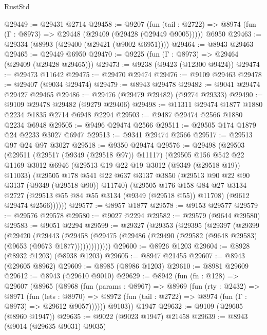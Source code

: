 \begin{lexlean}{RustStd}
\begin{coremodule}
@29449 := @29431 @2714
@29458 := @9207
    (fun (tail : @2722) => @8974 (fun (Γ : @8973) => @29448 (@29409 (@29428 (@29449 @9005)))))
    @6950
@29463 := @29334 (@8993 (@29400 (@29421 (@9002 @6951))))
@29464 := @8943 @29463
@29465 := @29449 @6950
@29470 := @9225 (fun (Γ : @8973) => @29464 (@29409 (@29428 @29465)))
@29473 := @9238 (@9423 (@12300 @9424))
@29474 := @29473 @11642
@29475 := @29470 @29474
@29476 := @9109 @29463
@29478 := @29407 (@9034 @29474)
@29479 := @8943 @29478
@29482 := @9041 @29474 @29427 @29465
@29486 := @29476 (@29479 @29482) (@9274 @29333)
@29490 := @9109 @29478 @29482 (@9279 @29406)
@29498 := @11311 @29474 @1877 @1880 @2234 @1835 @2714 @6948 @2294
@29503 := @9487 @29474 @2566 @1880 @2234 @6948
@29505 := @9496 @29474 @2566
@29511 := @29505 @174 @1879 @24 @2233 @3027 @6947
@29513 := @9341 @29474 @2566
@29517 := @29513 @97 @24 @97 @3027
@29518 := @9350 @29474
@29576 := @29498
    (@29503
      (@29511
        (@29517 (@9349 (@29518 @97)) @11117)
        (@29505
          @156
          @542
          @22
          @1169
          @3012
          @6946
          (@29513 @19 @22 @19 @3012 (@9349 (@29518 @19)) @11033)
          (@29505
            @178
            @541
            @22
            @637
            @3137
            @3850
            (@29513 @90 @22 @90 @3137 (@9349 (@29518 @90)) @11740)
            (@29505
              @176
              @158
              @84
              @27
              @3134
              @2727
              (@29513 @55 @84 @55 @3134 (@9349 (@29518 @55)) @11708)
              (@9612 @29474 @2566))))))
@29577 := @8957 @1877
@29578 := @9153 @29577
@29579 := @29576 @29578
@29580 := @9027 @2294
@29582 := @29579 (@9644 @29580)
@29583 := @9051 @2294
@29599 := @29327
    (@29353
      (@29395
        (@29397
          (@29399
            (@29420
              (@29443
                (@29458
                  (@29475 (@29486 (@29490 (@29582 (@9648 @29583) (@9653 (@9673 @1877)))))))))))))
@29600 := @8926 @1203
@29604 := @8928 (@8932 @1203) (@8938 @1203)
@29605 := @8947 @21455
@29607 := @8943 (@29605 @8962)
@29609 := @8985 (@8986 @1203)
@29610 := @8981 @29609
@29612 := @8943 (@29610 @9010)
@29629 := @8942
    (fun (fn : @128) =>
    @29607
      (@8965
        (@8968
          (fun (params : @8967) =>
          @8969
            (fun (rty : @2432) =>
            @8971
              (fun (lets : @8970) =>
              @8972 (fun (tail : @2722) => @8974 (fun (Γ : @8973) => @29612 @9057))))))
        @9103))
    @1947
@29632 := @9109 (@29605 (@8960 @1947))
@29635 := @9022 (@9023 @1947) @21458
@29639 := @8943 (@9014 (@29635 @9031) @9035)

\end{coremodule}
\end{lexlean}
